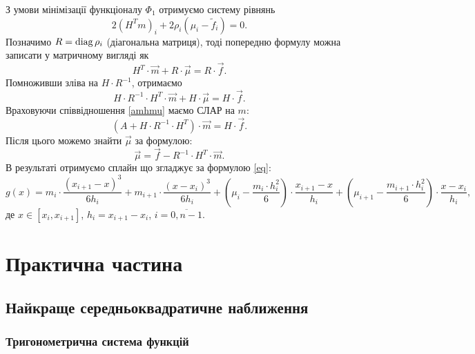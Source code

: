 З умови мінімізації функціоналу $\Phi_1$ отримуємо систему рівнянь \[ 2 (H^T m)_i + 2 \rho_i (\mu_i - \tilde f_i) = 0. \] Позначимо $R = \operatorname{diag} \rho_i$ (діагональна матриця), тоді попередню формулу можна записати у матричному вигляді як \[ H^T \cdot \vec m + R \cdot \vec \mu = R \cdot \vec f.\] Помноживши зліва на $H \cdot R^{-1}$, отримаємо \[ H \cdot R^{-1} \cdot H^T \cdot \vec m + H \cdot \vec \mu = H \cdot \vec f. \] Враховуючи співвідношення \eqref{amhmu} маємо СЛАР на $m$: \[ (A + H \cdot R^{-1} \cdot H^T) \cdot \vec m = H \cdot \vec f.\] Після цього можемо знайти $\vec \mu$ за формулою: \[\vec \mu = \vec f - R^{-1} \cdot H^{T} \cdot \vec m.\] В результаті отримуємо сплайн що згладжує за формулою \eqref{eq}: \[ g(x) = m_i \cdot \frac{(x_{i + 1} - x)^3}{6 h_i} + m_{i + 1} \cdot \frac{(x - x_i)^3}{6 h_i} + \left( \mu_i - \frac{m_i \cdot h_i^2}{6} \right) \cdot \frac{x_{i + 1} - x}{h_i} + \left( \mu_{i + 1} - \frac{m_{i + 1} \cdot h_i^2}{6}\right) \cdot \frac{x - x_i}{h_i}, \] де $x \in [x_i, x_{i + 1}]$, $h_i = x_{i + 1} - x_i$, $i = \overline{0, n - 1}$.

\section{Практична частина}

\subsection{Найкраще середньоквадратичне наближення}



\subsubsection{Тригонометрична система функцій}

